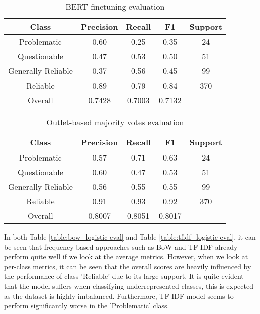\begin{table}[htbp]
    \centering
    \begin{tabular}{|| c | c | c | c | c ||}
        \hline
        Class              & Precision & Recall & F1     & Support \\
        \hline
        \hline
        Problematic        & 0.60      & 0.25   & 0.35   & 24      \\
        \hline
        Questionable       & 0.47      & 0.53   & 0.50   & 51      \\
        \hline
        Generally Reliable & 0.37      & 0.56   & 0.45   & 99      \\
        \hline
        Reliable           & 0.89      & 0.79   & 0.84   & 370     \\
        \hline
        Overall            & 0.7428    & 0.7003 & 0.7132 &         \\
        \hline
    \end{tabular}
    \caption{BERT finetuning evaluation}
    \label{table:bert-finetuning-eval}
\end{table}


\begin{table}[htbp]
    \centering
    \begin{tabular}{|| c | c | c | c | c ||}
        \hline
        Class              & Precision & Recall & F1     & Support \\
        \hline
        \hline
        Problematic        & 0.57      & 0.71   & 0.63   & 24      \\
        \hline
        Questionable       & 0.60      & 0.47   & 0.53   & 51      \\
        \hline
        Generally Reliable & 0.56      & 0.55   & 0.55   & 99      \\
        \hline
        Reliable           & 0.91      & 0.93   & 0.92   & 370     \\
        \hline
        Overall            & 0.8007    & 0.8051 & 0.8017 &         \\
        \hline
    \end{tabular}
    \caption{Outlet-based majority votes evaluation}
    \label{table:majority-votes-eval}
\end{table}


In both Table \ref{table:bow_logistic-eval} and Table \ref{table:tfidf_logistic-eval}, it can be seen that frequency-based approaches such as BoW and TF-IDF already perform quite well if we look at the average metrics. However, when we look at per-class metrics, it can be seen that the overall scores are heavily influenced by the performance of class 'Reliable' due to its large support. It is quite evident that the model suffers when classifying underrepresented classes, this is expected as the dataset is highly-imbalanced. Furthermore, TF-IDF model seems to perform significantly worse in the 'Problematic' class.

